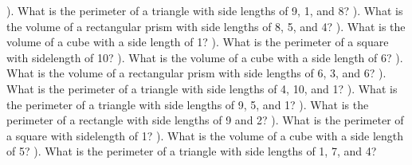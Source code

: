 \documentclass{article}%
\begin{document}
). What is the perimeter of a triangle with side lengths of 9, 1, and 8?%
\newline%
\newline%
). What is the volume of a rectangular prism with side lengths of 8, 5, and 4?%
\newline%
\newline%
). What is the volume of a cube with a side length of 1?%
\newline%
\newline%
). What is the perimeter of a square with sidelength of 10?%
\newline%
\newline%
). What is the volume of a cube with a side length of 6?%
\newline%
\newline%
). What is the volume of a rectangular prism with side lengths of 6, 3, and 6?%
\newline%
\newline%
). What is the perimeter of a triangle with side lengths of 4, 10, and 1?%
\newline%
\newline%
). What is the perimeter of a triangle with side lengths of 9, 5, and 1?%
\newline%
\newline%
). What is the perimeter of a rectangle with side lengths of 9 and 2?%
\newline%
\newline%
). What is the perimeter of a square with sidelength of 1?%
\newline%
\newline%
). What is the volume of a cube with a side length of 5?%
\newline%
\newline%
). What is the perimeter of a triangle with side lengths of 1, 7, and 4?%
\newline%
\newline%
\end{document}
